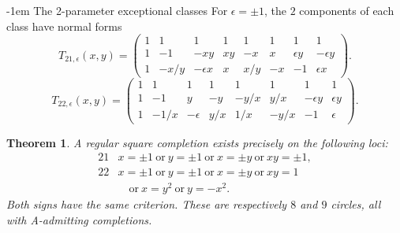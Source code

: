 \documentclass[11pt,a4paper]{article}
\makeatletter
\newtheorem{theorem}{Theorem}[section]
\theoremstyle{plain}
\theoremstyle{definition}
\numberwithin{equation}{section}
\renewcommand\subsection{\@startsection{subsection}{2}{\z@}  {\medskipamount}  {-1em}  {\normalfont\normalsize\bfseries}}
\makeatother
\begin{document}
\subsection{The 2-parameter exceptional classes}\label{sec:class21}\label{sec:class22}
For $\epsilon=\pm1$, the $2$ components of each class have normal forms
$$
T_{21,\epsilon}(x,y)=
\begin{pmatrix}
1&1&1&1&1&1&1&1\\
1&-1&-xy&xy&-x&x&\epsilon y&-\epsilon y\\
1&-x/y&-\epsilon x&x&x/y&-x&-1&\epsilon x
\end{pmatrix}.
$$
$$
T_{22,\epsilon}(x,y)=
\begin{pmatrix}
1&1&1&1&1&1&1&1\\
1&-1&y&-y&-y/x&y/x&-\epsilon y&\epsilon y\\
1&-1/x&-\epsilon&y/x&1/x&-y/x&-1&\epsilon
\end{pmatrix}.
$$
\begin{theorem}\label{thm:21}\label{thm:22}
A regular square completion exists precisely on the following loci:
$$\begin{array}{c|l}
21&x=\pm1\ \text{or}\ y=\pm1\ \text{or}\ x=\pm y\ \text{or}\ xy=\pm1,\\[2pt]
22&x=\pm1\ \text{or}\ y=\pm1\ \text{or}\ x=\pm y\ \text{or}\ xy=1\\
&\hspace{12pt}\text{or}\ x=y^2\ \text{or}\ y=-x^2.
\end{array}$$
Both signs have the same criterion. These are respectively $8$ and $9$ circles, all with A-admitting completions.
\end{theorem}
\end{document}
